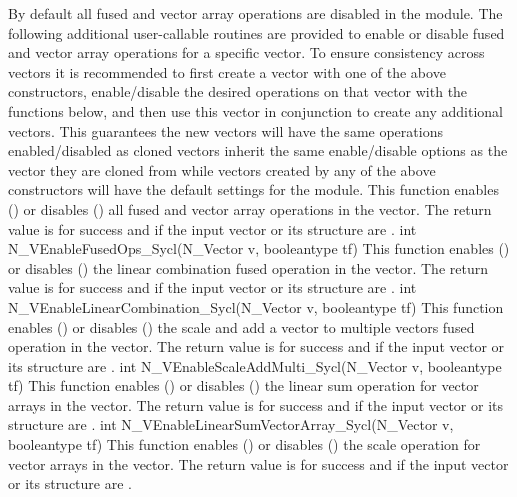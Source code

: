 By default all fused and vector array operations are disabled in the {\nvecsycl}
module. The following additional user-callable routines are provided to
enable or disable fused and vector array operations for a specific vector. To
ensure consistency across vectors it is recommended to first create a vector
with one of the above constructors, enable/disable the desired operations on
that vector with the functions below, and then use this vector in conjunction
 to create any additional vectors. This guarantees the new vectors
will have the same operations enabled/disabled as cloned vectors inherit the
same enable/disable options as the vector they are cloned from while vectors
created by any of the above constructors will have the default settings for the
{\nvecsycl} module.
{
  This function enables () or disables () all fused and
  vector array operations in the {\sycl} vector. The return value is  for
  success and  if the input vector or its  structure are .
}
{
  int N\_VEnableFusedOps\_Sycl(N\_Vector v, booleantype tf)
}
{
  This function enables () or disables () the linear
  combination fused operation in the {\sycl} vector. The return value is  for
  success and  if the input vector or its  structure are .
}
{
  int N\_VEnableLinearCombination\_Sycl(N\_Vector v, booleantype tf)
}
{
  This function enables () or disables () the scale and
  add a vector to multiple vectors fused operation in the {\sycl} vector. The
  return value is  for success and  if the input vector or its
   structure are .
}
{
  int N\_VEnableScaleAddMulti\_Sycl(N\_Vector v, booleantype tf)
}
{
  This function enables () or disables () the linear sum
  operation for vector arrays in the {\sycl} vector. The return value is  for
  success and  if the input vector or its  structure are .
}
{
  int N\_VEnableLinearSumVectorArray\_Sycl(N\_Vector v, booleantype tf)
}
{
  This function enables () or disables () the scale
  operation for vector arrays in the {\sycl} vector. The return value is  for
  success and  if the input vector or its  structure are .
}
